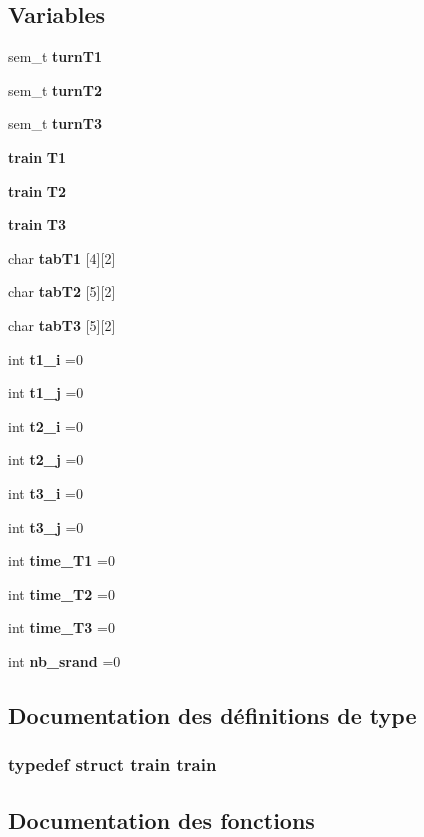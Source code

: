 \subsection*{Variables}
\begin{DoxyCompactItemize}
\item 
sem\+\_\+t {\bf turn\+T1}
\item 
sem\+\_\+t {\bf turn\+T2}
\item 
sem\+\_\+t {\bf turn\+T3}
\item 
{\bf train} {\bf T1}
\item 
{\bf train} {\bf T2}
\item 
{\bf train} {\bf T3}
\item 
char {\bf tab\+T1} [4][2]
\item 
char {\bf tab\+T2} [5][2]
\item 
char {\bf tab\+T3} [5][2]
\item 
int {\bf t1\+\_\+i} =0
\item 
int {\bf t1\+\_\+j} =0
\item 
int {\bf t2\+\_\+i} =0
\item 
int {\bf t2\+\_\+j} =0
\item 
int {\bf t3\+\_\+i} =0
\item 
int {\bf t3\+\_\+j} =0
\item 
int {\bf time\+\_\+\+T1} =0
\item 
int {\bf time\+\_\+\+T2} =0
\item 
int {\bf time\+\_\+\+T3} =0
\item 
int {\bf nb\+\_\+srand} =0
\end{DoxyCompactItemize}


\subsection{Documentation des définitions de type}
\subsubsection[{train}]{\setlength{\rightskip}{0pt plus 5cm}typedef struct {\bf train} {\bf train}}\label{thread_8h_ac5e7144c0ff0fd46a7f4a5ff8cab1e72}


\subsection{Documentation des fonctions}
